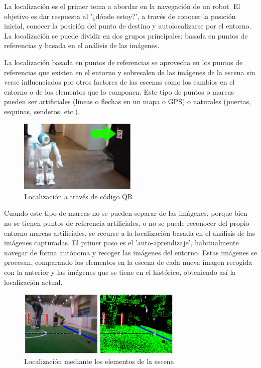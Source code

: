 La localización es el primer tema a abordar en la navegación de un robot. El
objetivo es dar respuesta al '¿dónde estoy?', a través de conocer la posición
inicial, conocer la posición del punto de destino y autolocalizarse por el
entorno. La localización se puede dividir en dos grupos principales: basada en
puntos de referencias y basada en el análisis de las imágenes.

La localización basada en puntos de referencias se aprovecha en los puntos de
referencias que existen en el entorno y sobresalen de las imágenes de la escena
sin verse influenciados por otros factores de las escenas como los cambios en el
entorno o de los elementos que lo componen. Este tipo de puntos o marcas pueden
ser artificiales (líneas o flechas en un mapa o GPS) o naturales (puertas,
esquinas, senderos, etc.).

\begin{figure}[!th]
  \begin{center}
    \includegraphics[width=0.5\textwidth]{images/cap2/LocalizacionMarcas.eps}
    \caption{Localización a través de código QR}
    \label{fig:LocalizacionMarcas}
  \end{center}
\end{figure}

Cuando este tipo de marcas no se pueden separar de las imágenes, porque bien no
se tienen puntos de referencia artificiales, o no se puede reconocer del propio
entorno marcas artificiales, se recurre a la localización basada en el análisis
de las imágenes capturadas. El primer paso es el 'auto-aprendizaje',
habitualmente navegar de forma autónoma y recoger las imágenes del entorno.
Estas imágenes se procesan, comparando los elementos en la escena de cada nueva
imagen recogida con la anterior y las imágenes que se tiene en el histórico,
obteniendo así la localización actual.

\begin{figure}[!th]
  \begin{center}
    \includegraphics[width=0.7\textwidth]{images/cap2/LocalizacionImagenes.eps}
    \caption{Localización mediante los elementos de la escena}
    \label{fig:LocalizacionImagenes}
  \end{center}
\end{figure}


